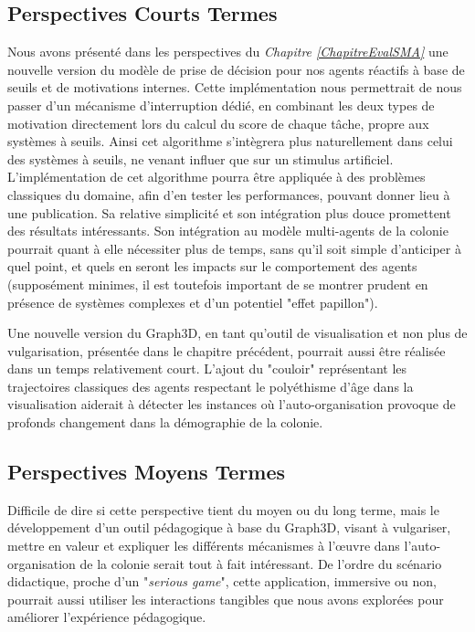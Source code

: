	\subsection*{Perspectives Courts Termes}	
	Nous avons présenté dans les perspectives du \textit{Chapitre \ref{ChapitreEvalSMA}} une nouvelle version du modèle de prise de décision pour nos agents réactifs à base de seuils et de motivations internes. Cette implémentation nous permettrait de nous passer d'un mécanisme d'interruption dédié, en combinant les deux types de motivation directement lors du calcul du score de chaque tâche, propre aux systèmes à seuils. Ainsi cet algorithme s'intègrera plus naturellement dans celui des systèmes à seuils, ne venant influer que sur un stimulus artificiel. L'implémentation de cet algorithme pourra être appliquée à des problèmes classiques du domaine, afin d'en tester les performances, pouvant donner lieu à une publication. Sa relative simplicité et son intégration plus douce promettent des résultats intéressants. Son intégration au modèle multi-agents de la colonie pourrait quant à elle nécessiter plus de temps, sans qu'il soit simple d'anticiper à quel point, et quels en seront les impacts sur le comportement des agents (supposément minimes, il est toutefois important de se montrer prudent en présence de systèmes complexes et d'un potentiel "effet papillon").
	
	Une nouvelle version du Graph3D, en tant qu'outil de visualisation et non plus de vulgarisation, présentée dans le chapitre précédent, pourrait aussi être réalisée dans un temps relativement court. L'ajout du "couloir" représentant les trajectoires classiques des agents respectant le polyéthisme d'âge dans la visualisation aiderait à détecter les instances où l'auto-organisation provoque de profonds changement dans la démographie de la colonie.
	
	\subsection*{Perspectives Moyens Termes}	
	Difficile de dire si cette perspective tient du moyen ou du long terme, mais le développement d'un outil pédagogique à base du Graph3D, visant à vulgariser, mettre en valeur et expliquer les différents mécanismes à l'œuvre dans l'auto-organisation de la colonie serait tout à fait intéressant. De l'ordre du scénario didactique, proche d'un "\textit{serious game}", cette application, immersive ou non, pourrait aussi utiliser les interactions tangibles que nous avons explorées pour améliorer l'expérience pédagogique.
	
